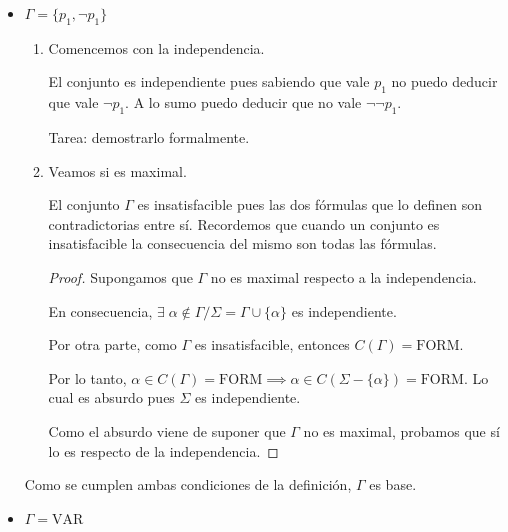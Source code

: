 \begin{itemize}
    \item $\Gamma = \{ p_1, \neg p_1 \}$

        \begin{enumerate}
            \item Comencemos con la independencia.

                El conjunto es independiente pues sabiendo que vale $p_1$ no
                puedo deducir que vale $\neg p_1$. A lo sumo puedo deducir 
                que no vale $\neg \neg p_1$.

                Tarea: demostrarlo formalmente.

            \item Veamos si es maximal.

                El conjunto $\Gamma$ es insatisfacible pues las dos fórmulas
                que lo definen son contradictorias entre sí. Recordemos
                que cuando un conjunto es insatisfacible la consecuencia del 
                mismo son todas las fórmulas.


                \begin{proof} \phantom{.}
                
                    Supongamos que $\Gamma$ no es maximal respecto a la 
                    independencia.

                    En consecuencia, $\exists \; \alpha \notin \Gamma /
                    \Sigma=\Gamma \cup \{ \alpha \}$ es independiente.

                    Por otra parte, como $\Gamma$ es insatisfacible, entonces 
                    $C(\Gamma)=\mathrm{FORM}$.

                    Por lo tanto, $\alpha \in C(\Gamma) = \mathrm{FORM} \implies
                    \alpha \in C(\Sigma - \{ \alpha \}) = \mathrm{FORM}$. Lo cual es
                    absurdo pues $\Sigma$ es independiente.

                    Como el absurdo viene de suponer que $\Gamma$ no es
                    maximal, probamos que sí lo es respecto de la 
                    independencia.

                \end{proof}

        \end{enumerate}

        Como se cumplen ambas condiciones de la definición, $\Gamma$ es base.

    \item $\Gamma = \mathrm{VAR}$


\end{itemize}
